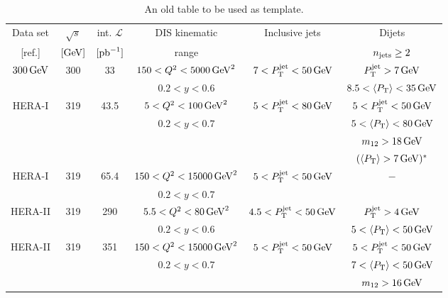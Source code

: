 \documentclass[12pt]{article}
\begin{document}
\begin{table}[tbhp]
  \footnotesize
  \begin{center}
    \begin{tabular}{cccccc}
      \hline
      \multicolumn{1}{c}{Data set} & $\sqrt{s}$ & int. $\mathcal{L}$ & DIS kinematic &  Inclusive jets &  Dijets   \\  
      \multicolumn{1}{c}{[ref.]}  & $[\mathrm{GeV}]$   & $[{\rm pb}^{-1}]$  &  range        &                 &   $n_{\rm jets}\ge2 $  \\   
      \hline
      $300\,\mathrm{GeV}$ & 300 & 33& $150<Q^{2}<5000\,\mathrm{GeV}^2$  & $7<P_{\rm T}^{\rm jet}<50\,\mathrm{GeV}$ & $P_{\rm T}^{\rm jet}>7\,\mathrm{GeV}$  \\
      \cite{Adloff:2000tq} &          & & $0.2<y<0.6$             &            & $8.5<\langle P_{\rm T} \rangle<35\,\mathrm{GeV}$    \\
      \hline
      HERA-I    & 319  &43.5 & $5<Q^{2}<100\,\mathrm{GeV}^2$   &   $5<P_{\rm T}^{\rm jet}<80\,\mathrm{GeV}$ & $5<P_{\rm T}^{\rm jet}<50\,\mathrm{GeV}$  \\
\cite{Aaron:2010ac}  &      &     & $0.2<y<0.7$                &                      & $5<\langle P_{\rm T} \rangle<80\,\mathrm{GeV}$  \\
                &           &     &                            &                      & $m_{12}>18\,\mathrm{GeV}$  \\
                &           &     &                            &                      & $(\langle P_{\rm T} \rangle>7\,\mathrm{GeV})^*$ \\
      \hline
      HERA-I    & 319  &65.4 & $150<Q^{2}<15000\,\mathrm{GeV}^2$   &   $5<P_{\rm T}^{\rm jet}<50\,\mathrm{GeV}$ & $-$  \\
\cite{Aktas:2007aa} &  &     & $0.2<y<0.7$             &                      &  \\
      \hline
      HERA-II   & 319  & 290& $5.5<Q^{2}<80\,\mathrm{GeV}^2$        & $4.5<P_{\rm T}^{\rm jet}<50\,\mathrm{GeV}$ & $P_{\rm T}^{\rm jet}>4\,\mathrm{GeV}$  \\
\cite{Andreev:2016tgi}&& & $0.2<y<0.6$                &                      & $5<\langle P_{\rm T} \rangle<50\,\mathrm{GeV}$  \\
      \hline
      HERA-II   & 319  & 351& $150<Q^{2}<15000\,\mathrm{GeV}^2$     &   $5<P_{\rm T}^{\rm jet}<50\,\mathrm{GeV}$ & $5<P_{\rm T}^{\rm jet}<50\,\mathrm{GeV}$  \\
 \cite{Andreev:2014wwa,Andreev:2016tgi}               &           & & $0.2<y<0.7$                &                      & $7<\langle P_{\rm T} \rangle<50\,\mathrm{GeV}$  \\
                &           & &                            &                      & $m_{12}>16\,\mathrm{GeV}$  \\
      \hline
    \end{tabular}
    \caption{
      An old table to be used as template.
    }
    \label{tab:datasetsJets}
    \end{center}
\end{table}
\end{document}
